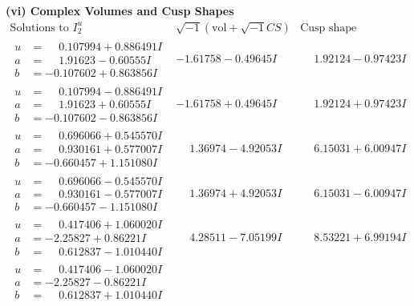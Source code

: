 \documentclass[1p]{elsarticle_modified}
\theoremstyle{definition}
\newcommand{\I}{\sqrt{-1}}
\begin{document}
\newpage\flushleft \textbf{(vi) Complex Volumes and Cusp Shapes}
$$\begin{array}{c|c|c}  
\text{Solutions to }I^u_{2}& \I (\text{vol} + \sqrt{-1}CS) & \text{Cusp shape}\\
 \hline 
\begin{aligned}
u &= \phantom{-}0.107994 + 0.886491 I \\
a &= \phantom{-}1.91623 - 0.60555 I \\
b &= -0.107602 + 0.863856 I\end{aligned}
 & -1.61758 - 0.49645 I & \phantom{-}1.92124 - 0.97423 I \\ \hline\begin{aligned}
u &= \phantom{-}0.107994 - 0.886491 I \\
a &= \phantom{-}1.91623 + 0.60555 I \\
b &= -0.107602 - 0.863856 I\end{aligned}
 & -1.61758 + 0.49645 I & \phantom{-}1.92124 + 0.97423 I \\ \hline\begin{aligned}
u &= \phantom{-}0.696066 + 0.545570 I \\
a &= \phantom{-}0.930161 + 0.577007 I \\
b &= -0.660457 + 1.151080 I\end{aligned}
 & \phantom{-}1.36974 - 4.92053 I & \phantom{-}6.15031 + 6.00947 I \\ \hline\begin{aligned}
u &= \phantom{-}0.696066 - 0.545570 I \\
a &= \phantom{-}0.930161 - 0.577007 I \\
b &= -0.660457 - 1.151080 I\end{aligned}
 & \phantom{-}1.36974 + 4.92053 I & \phantom{-}6.15031 - 6.00947 I \\ \hline\begin{aligned}
u &= \phantom{-}0.417406 + 1.060020 I \\
a &= -2.25827 + 0.86221 I \\
b &= \phantom{-}0.612837 - 1.010440 I\end{aligned}
 & \phantom{-}4.28511 - 7.05199 I & \phantom{-}8.53221 + 6.99194 I \\ \hline\begin{aligned}
u &= \phantom{-}0.417406 - 1.060020 I \\
a &= -2.25827 - 0.86221 I \\
b &= \phantom{-}0.612837 + 1.010440 I\end{aligned}

\end{array}$$
\end{document}

